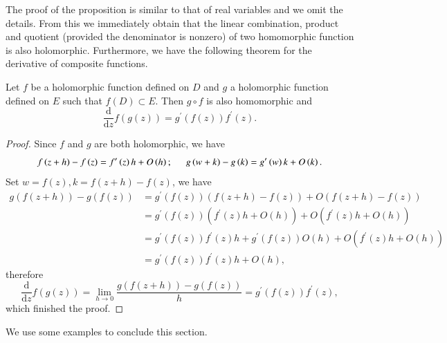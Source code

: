 The proof of the proposition is similar to that of real variables and we omit the details. From this we immediately obtain that the linear combination, product and quotient (provided the denominator is nonzero) of two homomorphic function is also holomorphic. Furthermore, we have the following theorem for the derivative of composite functions.
\begin{theorem}
Let $f$ be a holomorphic function defined on $D$ and $g$ a holomorphic function defined on $E$ such that $f(D)\subset E$. Then $g\circ f$ is also homomorphic and 
$$
\frac{\mathrm{d}}{\mathrm{d}z}f\left( g\left( z \right) \right) =g^{\prime}\left( f\left( z \right) \right) f^{\prime}\left( z \right) .
$$
\end{theorem}
\begin{proof}
Since $f$ and $g$ are both holomorphic, we have 
$$
f\left( z+h \right) -f\left( z \right) =f^{\prime}\left( z \right) h+O\left( h \right) ;\hspace{0.5cm}g\left( w+k \right) -g\left( k \right) =g^{\prime}\left( w \right) k+O\left( k \right) .
$$
Set $w=f\left( z \right) ,k=f\left( z+h \right) -f\left( z \right) $, we have 
$$
\begin{aligned}
g\left( f\left( z+h \right) \right) -g\left( f\left( z \right) \right) &=g^{\prime}\left( f\left( z \right) \right) \left( f\left( z+h \right) -f\left( z \right) \right) +O\left( f\left( z+h \right) -f\left( z \right) \right) 
\\
&=g^{\prime}\left( f\left( z \right) \right) \left( f^{\prime}\left( z \right) h+O\left( h \right) \right) +O\left( f^{\prime}\left( z \right) h+O\left( h \right) \right) 
\\
&=g^{\prime}\left( f\left( z \right) \right) f^{\prime}\left( z \right) h+g^{\prime}\left( f\left( z \right) \right) O\left( h \right) +O\left( f^{\prime}\left( z \right) h+O\left( h \right) \right) 
\\
&=g^{\prime}\left( f\left( z \right) \right) f^{\prime}\left( z \right) h+O\left( h \right) ,
\end{aligned}
$$
therefore 
$$
\frac{\mathrm{d}}{\mathrm{d}z}f\left( g\left( z \right) \right) =\lim_{h\rightarrow 0} \frac{g\left( f\left( z+h \right) \right) -g\left( f\left( z \right) \right)}{h}=g^{\prime}\left( f\left( z \right) \right) f^{\prime}\left( z \right) ,
$$
which finished the proof.
\end{proof}
We use some examples to conclude this section.
